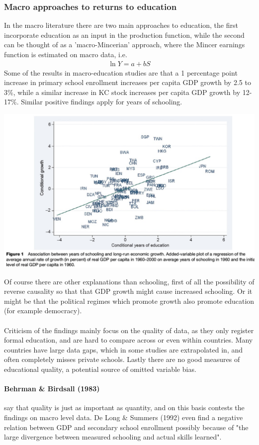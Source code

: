 \documentclass[12pt, a4paper]{article}
\begin{document}
\begin{multicols}{2}
\subsubsection{Macro approaches to returns to education}
In the macro literature there are two main approaches to education, the first incorporate education as an input in the production function, while the second can be thought of as a 'macro-Mincerian' approach, where the Mincer earnings function is estimated on macro data, i.e.
\begin{align*}
\ln Y = a + b S
\end{align*}
Some of the results in macro-education studies are that a 1 percentage point increase in primary school enrollment increases per capita GDP growth by 2.5 to 3\%, while a similar increase in KC stock increases per capita GDP growth by 12-17\%. Similar positive findings apply for years of schooling.

\includegraphics[width = 0.45 \textwidth]{plothanus.jpg}

Of course there are other explanations than schooling, first of all the possibility of reverse causality so that that GDP growth might cause increased schooling. Or it might be that the political regimes which promote growth also promote education (for example democracy). 
\\ \\
Criticism of the findings mainly focus on the quality of data, as they only register formal education, and are hard to compare across or even within countries. Many countries have large data gaps, which in some studies are extrapolated in, and often completely misses private schools. Lastly there are no good measures of educational quality, a potential source of omitted variable bias. 

\paragraph{Behrman \& Birdsall (1983)} say that quality is just as important as quantity, and on this basis contests the findings on macro level data. De Long \& Summers (1992) even find a negative relation between GDP and secondary school enrollment possibly because of "the large divergence between measured schooling and actual skills learned".


\end{multicols}
\end{document}
